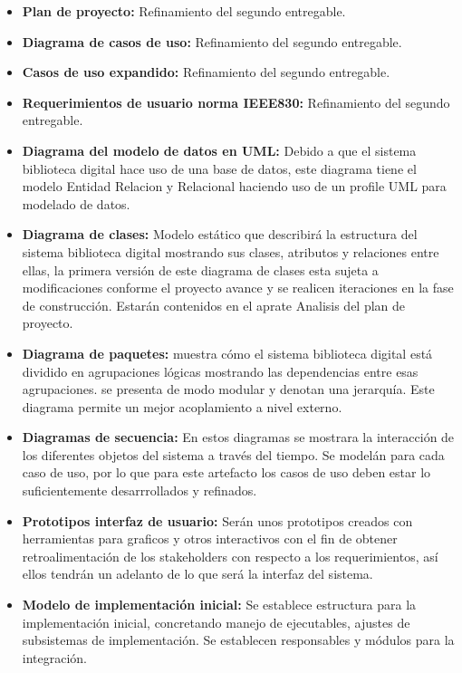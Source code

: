                 \begin{itemize}
                \item\textbf{Plan de proyecto:} Refinamiento del segundo entregable.
                \item\textbf{Diagrama de casos de uso:} Refinamiento del segundo entregable.
                \item\textbf{Casos de uso expandido:} Refinamiento del segundo entregable.
                \item\textbf{Requerimientos de usuario norma IEEE830:} Refinamiento del segundo
                entregable.
                \item\textbf{Diagrama del modelo de datos en UML:} Debido a que el sistema
                biblioteca digital hace uso de una base de datos, este diagrama tiene el modelo
                Entidad Relacion y Relacional haciendo uso de un profile UML para modelado de
                datos.
                \item\textbf{Diagrama de clases:} Modelo estático que describirá la estructura del
                sistema biblioteca digital mostrando sus clases, atributos y relaciones entre
                ellas, la primera versión de este diagrama de clases esta sujeta a modificaciones
                conforme el proyecto avance y se realicen iteraciones en la fase de construcción.
                Estarán contenidos en el aprate Analisis del plan de proyecto.
                \item\textbf{Diagrama de paquetes:} muestra cómo el sistema biblioteca digital está
                dividido en agrupaciones lógicas mostrando las dependencias entre esas
                agrupaciones. se presenta de modo modular y denotan una jerarquía. Este diagrama
                permite un mejor acoplamiento a nivel externo.
                \item\textbf{Diagramas de secuencia:} En estos diagramas se mostrara la interacción
                de los diferentes objetos del sistema a través del tiempo. Se modelán para cada
                caso de uso, por lo que para este artefacto los casos de uso deben estar lo
                suficientemente desarrrollados y refinados.
                \item\textbf{Prototipos interfaz de usuario:} Serán unos prototipos creados con
                herramientas para graficos y otros interactivos con el fin de obtener
                retroalimentación de los stakeholders con respecto a los requerimientos, así ellos
                tendrán un adelanto de lo que será la interfaz del sistema.
                \item\textbf{Modelo de implementación inicial:} Se establece estructura para la
                implementación inicial, concretando manejo de ejecutables, ajustes de subsistemas
                de implementación. Se establecen responsables y módulos para la integración.
                \end{itemize}
                
